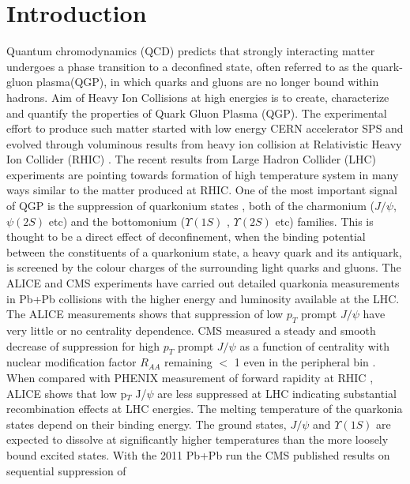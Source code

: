 \documentclass[aps,prc,preprint,superscriptaddress,showpacs,showkeys]{revtex4-1}
\begin{document}
\section{Introduction}
Quantum chromodynamics (QCD) predicts that strongly interacting matter undergoes a phase transition to a deconfined state, 
often referred to as the quark-gluon plasma(QGP), in which quarks and gluons are no longer bound within hadrons. Aim of Heavy 
Ion Collisions at high energies is to create, characterize and quantify the properties of Quark Gluon Plasma (QGP).  
 The experimental effort to produce such matter started with low energy CERN accelerator 
SPS and evolved through voluminous results from heavy ion collision at Relativistic Heavy Ion 
Collider (RHIC) \cite{INTRO}. The recent results from Large Hadron Collider (LHC) experiments \cite{QGP_Tc} are 
pointing towards formation of high temperature system in many ways similar to the matter
produced at RHIC. One of the most important signal of QGP is the suppression of 
quarkonium states \cite{SATZ}, both of the charmonium ($J/\psi$, $\psi(2S)$ etc) 
and the bottomonium ($\Upsilon(1S)$ , $\Upsilon(2S)$ etc) families. This is thought to be a 
direct effect of deconfinement, when the binding potential between the constituents of a quarkonium state, 
a heavy quark and its antiquark, is screened by the colour charges of the surrounding light quarks and gluons.
 The ALICE and CMS experiments have carried out detailed quarkonia measurements in Pb+Pb collisions 
with the higher energy and luminosity available at the LHC. The ALICE measurements \cite{ALICEJPsi} shows that suppression of 
low $p_T$ prompt $J/\psi$ have very little or no centrality dependence. CMS measured a steady and smooth decrease of 
suppression for high $p_T$ prompt $J/\psi$ as a function of centrality with nuclear modification factor $R_{AA}$ remaining $<$ 1 even 
in the peripheral bin \cite{JCMS,CMSJPsi}. When compared with PHENIX measurement of forward rapidity at RHIC \cite{PHENIXJPsi}, ALICE shows 
that low p$_T$ J/$\psi$ are less suppressed at LHC indicating substantial recombination effects at LHC energies.
 The melting temperature of the quarkonia states depend on their binding energy. The ground states, $J/\psi$ and $\Upsilon(1S)$ are expected to 
dissolve at significantly higher temperatures than the more loosely bound excited states. 
 With the 2011 Pb+Pb run the CMS published results on sequential suppression of 
\end{document}
